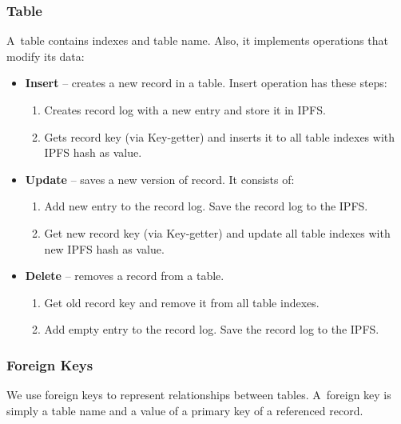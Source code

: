\subsubsection{Table}
A~table contains indexes and table name. Also, it implements operations that modify its data:
\begin{itemize}
    \item \textbf{Insert} -- creates a new record in a table. Insert operation has these steps: 
        \begin{enumerate}
            \item Creates record log with a new entry and store it in IPFS.
            \item Gets record key (via Key-getter) and inserts it to all table indexes with IPFS hash as value.
        \end{enumerate}
    \item \textbf{Update} -- saves a new version of record. It consists of:
        \begin{enumerate}
            \item Add new entry to the record log. Save the record log to the IPFS.
            \item Get new record key (via Key-getter) and update all table indexes with new IPFS hash as value.
        \end{enumerate}
    \item \textbf{Delete} -- removes a record from a table. 
        \begin{enumerate}
            \item Get old record key and remove it from all table indexes.
            \item Add empty entry to the record log. Save the record log to the IPFS.
        \end{enumerate}
\end{itemize}

\subsubsection{Foreign Keys}
We use foreign keys to represent relationships between tables. A~foreign key is simply a table name and a value of a primary key of a referenced record.

